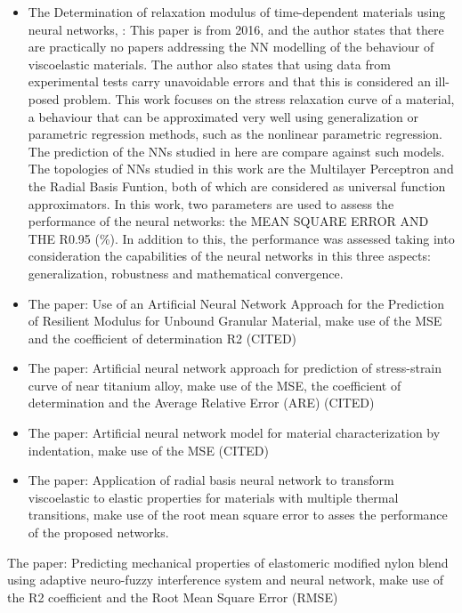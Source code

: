\begin{itemize}
    \item The Determination of relaxation modulus of time-dependent materials using neural networks, \cite{aulova2017determination}: This paper is from 2016, and the author states that there are practically no papers addressing the NN modelling of the behaviour of viscoelastic materials. The author also states that using data from experimental tests carry unavoidable errors and that this is considered an ill-posed problem. This work focuses on the stress relaxation curve of a material, a behaviour that can be approximated very well using generalization or parametric regression methods, such as the nonlinear parametric regression. The prediction of the NNs studied in here are compare against such models. The topologies of NNs studied in this work are the Multilayer Perceptron and the Radial Basis Funtion, both of which are considered as universal function approximators. In this work, two parameters are used to assess the performance of the neural networks: the MEAN SQUARE ERROR AND THE R0.95 (\%). In addition to this, the performance was assessed taking into consideration the capabilities of the neural networks in this three aspects: generalization, robustness and mathematical convergence.
    \item The paper: Use of an Artificial Neural Network Approach for the Prediction of Resilient Modulus for Unbound Granular Material, make use of the MSE and the coefficient of determination R2 (CITED)
    \item The paper: Artificial neural network approach for prediction of stress-strain curve of near titanium alloy, make use of the MSE, the coefficient of determination and the Average Relative Error (ARE) (CITED)
    \item The paper: Artificial neural network model for material characterization by indentation, make use of the MSE (CITED)
    \item The paper: Application of radial basis neural network to transform viscoelastic to elastic properties for materials with multiple thermal transitions, make use of the root mean square error to asses the performance of the proposed networks.
\end{itemize}

The paper: Predicting mechanical properties of elastomeric modified nylon blend using adaptive neuro-fuzzy interference system and neural network, make use of the R2 coefficient and the Root Mean Square Error (RMSE)


